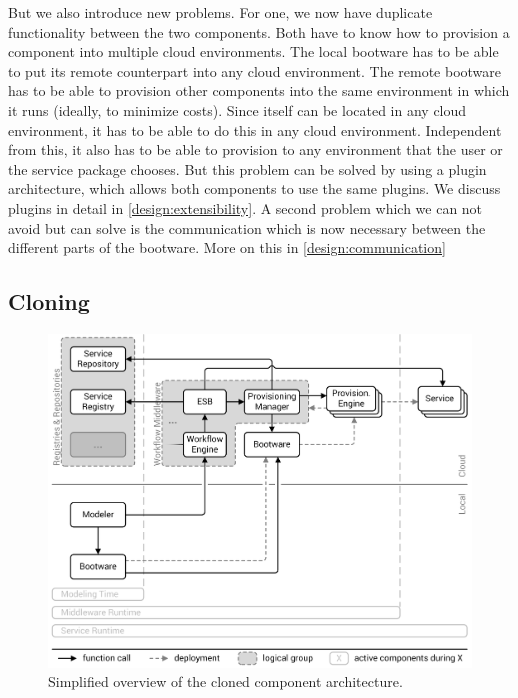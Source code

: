 But we also introduce new problems.
For one, we now have duplicate functionality between the two components.
Both have to know how to provision a component into multiple cloud environments.
The local bootware has to be able to put its remote counterpart into any cloud environment.
The remote bootware has to be able to provision other components into the same environment in which it runs (ideally, to minimize costs).
Since itself can be located in any cloud environment, it has to be able to do this in any cloud environment.
Independent from this, it also has to be able to provision to any environment that the user or the service package chooses.
But this problem can be solved by using a plugin architecture, which allows both components to use the same plugins.
We discuss plugins in detail in \autoref{design:extensibility}.
A second problem which we can not avoid but can solve is the communication which is now necessary between the different parts of the bootware.
More on this in \autoref{design:communication}

\subsection{Cloning}

\begin{figure}[!htbp]
	\centering
	\includegraphics[resolution=600]{design/assets/clone}
	\caption{Simplified overview of the cloned component architecture.}
	\label{image:clone}
\end{figure}

